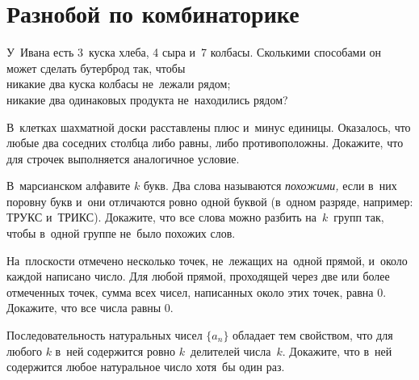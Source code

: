 
\section*{Разнобой по комбинаторике}


\begin{problems}

\item
У~Ивана есть 3~куска хлеба, 4 сыра и~7 колбасы.
Сколькими способами он может сделать бутерброд так, чтобы
\\
\subproblem никакие два куска колбасы не~лежали рядом;
\\
\subproblem никакие два одинаковых продукта не~находились рядом?

\item
В~клетках шахматной доски расставлены плюс и~минус единицы.
Оказалось, что любые два соседних столбца либо равны, либо противоположны.
Докажите, что для строчек выполняется аналогичное условие.

\item
В~марсианском алфавите $k$ букв.
Два слова называются \emph{похожими,} если в~них поровну букв и~они отличаются
ровно одной буквой (в~одном разряде, например: ТРУКС и~ТРИКС).
Докажите, что все слова можно разбить на~$k$~групп так, чтобы в~одной группе
не~было похожих слов.

\item
На~плоскости отмечено несколько точек, не~лежащих на~одной прямой, и~около
каждой написано число.
Для любой прямой, проходящей через две или более отмеченных точек, сумма всех
чисел, написанных около этих точек, равна 0.
Докажите, что все числа равны 0.

\item
Последовательность натуральных чисел $\{ a_{n} \}$ обладает тем свойством, что
для любого $k$ в~ней содержится ровно $k$~делителей числа~$k$.
Докажите, что в~ней содержится любое натуральное число хотя~бы один раз.

\end{problems}

